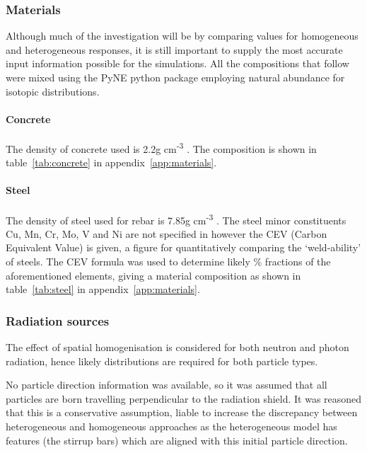 \subsubsection{Materials}
Although much of the investigation will be by comparing values for homogeneous and heterogeneous responses, it is still important to supply the most accurate input information possible for the simulations. All the compositions that follow were mixed using the PyNE python package \cite{Pyne18} employing natural abundance for isotopic distributions.

\paragraph{Concrete}
The density of concrete used is 2.2g cm\textsuperscript{-3} \cite{Jakhar16}. The composition is shown in table~\ref{tab:concrete} in appendix~\ref{app:materials}. 

\paragraph{Steel}
The density of steel used for rebar is 7.85g cm\textsuperscript{-3} \cite{BSsteel05}. The steel minor constituents Cu, Mn, Cr, Mo, V and Ni are not specified in \cite{BSsteel05} however the CEV (Carbon Equivalent Value) is given, a figure for quantitatively comparing the `weld-ability' of steels. The CEV formula was used to determine likely \% fractions of the aforementioned elements, giving a material composition as shown in table~\ref{tab:steel} in appendix~\ref{app:materials}.

\subsubsection{Radiation sources}
The effect of spatial homogenisation is considered for both neutron and photon radiation, hence likely distributions are required for both particle types.

No particle direction information was available, so it was assumed that all particles are born travelling perpendicular to the radiation shield. It was reasoned that this is a conservative assumption, liable to increase the discrepancy between heterogeneous and homogeneous approaches as the heterogeneous model has features (the stirrup bars) which are aligned with this initial particle direction.

